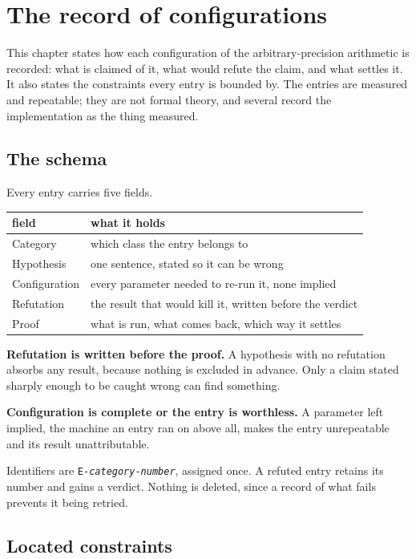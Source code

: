 \chapter{The record of configurations}

This chapter states how each configuration of the arbitrary-precision arithmetic is recorded: what
is claimed of it, what would refute the claim, and what settles it. It also states the constraints
every entry is bounded by. The entries are measured and repeatable; they are not formal theory, and
several record the implementation as the thing measured.

\section{The schema}

Every entry carries five fields.

\begin{center}
\begin{tabular}{@{}ll@{}}
\toprule
field & what it holds \\
\midrule
Category & which class the entry belongs to \\
Hypothesis & one sentence, stated so it can be wrong \\
Configuration & every parameter needed to re-run it, none implied \\
Refutation & the result that would kill it, written before the verdict \\
Proof & what is run, what comes back, which way it settles \\
\bottomrule
\end{tabular}
\end{center}

\textbf{Refutation is written before the proof.} A hypothesis with no refutation absorbs any result,
because nothing is excluded in advance. Only a claim stated sharply enough to be caught wrong can find
something.

\textbf{Configuration is complete or the entry is worthless.} A parameter left implied, the machine an
entry ran on above all, makes the entry unrepeatable and its result unattributable.

Identifiers are \texttt{E-\textit{category}-\textit{number}}, assigned once. A refuted entry retains its
number and gains a verdict. Nothing is deleted, since a record of what fails prevents it being
retried.

\section{Located constraints}

